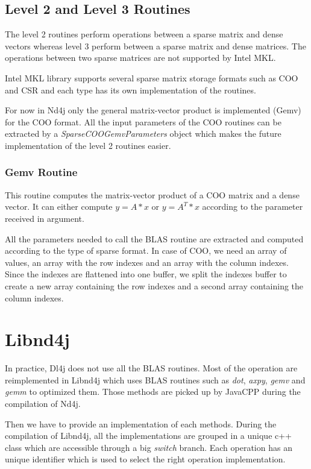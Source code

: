 \subsection{Level 2 and Level 3 Routines}

The level 2 routines perform operations between a sparse matrix and dense vectors whereas level 3 perform between a sparse matrix and dense matrices. The operations between two sparse matrices are not supported by Intel MKL.

Intel MKL library supports several sparse matrix storage formats such as COO and CSR and each type has its own implementation of the routines.

For now in Nd4j only the general matrix-vector product is implemented (Gemv) for the COO format. All the input parameters of the COO routines can be extracted by a \textit{SparseCOOGemvParameters} object which makes the future implementation of the level 2 routines easier.

\subsubsection{Gemv Routine}
This routine computes the matrix-vector product of a COO matrix and a dense vector. It can either compute $y = A*x$ or $y = A^{T}*x$ according to the parameter received in argument.

All the parameters needed to call the BLAS routine are extracted and computed according to the type of sparse format.
In case of COO, we need an array of values, an array with the row indexes and an array with the column indexes. Since the indexes are flattened into one buffer, we split the indexes buffer to create a new array containing the row indexes and a second array containing the column indexes.

\section{Libnd4j}

In practice, Dl4j does not use all the BLAS routines. Most of the operation are reimplemented in Libnd4j which uses BLAS routines such as \textit{dot}, \textit{axpy}, \textit{gemv} and \textit{gemm} to optimized them.  Those methods are picked up by JavaCPP during the compilation of Nd4j.

Then we have to provide an implementation of each methods. During the compilation of Libnd4j, all the implementations are grouped in a unique c++ class which are accessible through a big \textit{switch} branch. Each operation has an unique identifier which is used to select the right operation implementation.
